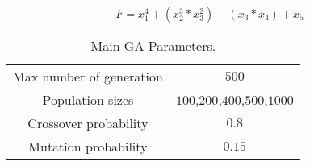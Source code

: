 
\begin{equation}
\label{eq:fitness}
 F=x_{1}^{4} + (x_{2}^{3} * x_{3}^{2}) - (x_{3} * x_{4}) + x_{5} 
\end{equation}


\begin{table}
\renewcommand{\arraystretch}{1.3}
\centering
\caption{Main GA Parameters.}
\label{Table:par_genetico}
\begin{tabular}{cc}
\hline
Max number of generation & $500$ \\
Population sizes & $100$,$200$,$400$,$500$,$1000$ \\
Crossover probability & $0.8$ \\ 
Mutation probability & $0.15$ \\ 
\hline
\end{tabular}
\end{table} 
